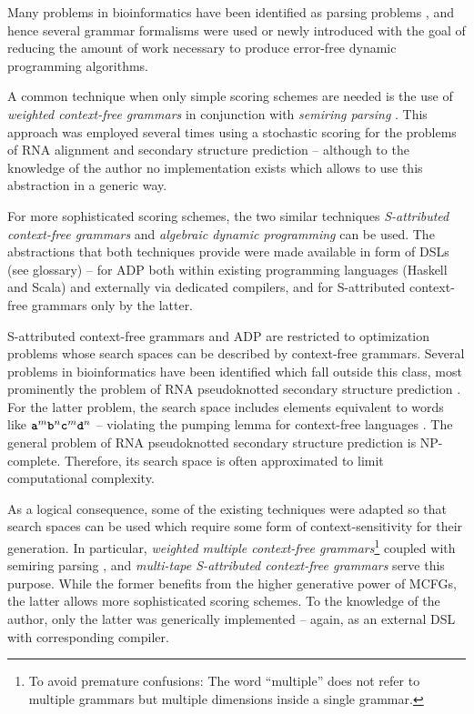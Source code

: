 \documentclass[
    a4paper,
    12pt,
    twoside,
    BCOR=12mm,
    parskip=half,
    chapterprefix,
    numbers=noenddot,
    bibliography=totoc
]{scrbook}
\begin{document}
Many problems in bioinformatics have been identified as parsing problems \citep{searls_linguistic_1997}, and hence several grammar formalisms were used or newly introduced with the goal of reducing the amount of work necessary to produce error-free dynamic programming algorithms.

A common technique when only simple scoring schemes are needed is the use of \emph{weighted context-free grammars} in conjunction with \emph{semiring parsing} \citep{goodman_semiring_1999}. This approach was employed several times using a stochastic scoring for the problems of RNA alignment and secondary structure prediction \citep{brown_small_2000,eddy_rna_1994,sakakibara_recent_1994} -- although to the knowledge of the author no implementation exists which allows to use this abstraction in a generic way.

For more sophisticated scoring schemes, the two similar techniques \emph{S-attributed context-free grammars} \citep{lefebvre_optimized_1995} and \emph{algebraic dynamic programming} \citep{giegerich_discipline_2004} can be used. The abstractions that both techniques provide were made available in form of \glspl{DSL} (see glossary) -- for \gls{ADP} both within existing programming languages (Haskell and Scala) and externally via dedicated compilers, and for S-attributed context-free grammars only by the latter.

S-attributed context-free grammars and \gls{ADP} are restricted to optimization problems whose search spaces can be described by context-free grammars. Several problems in bioinformatics have been identified which fall outside this class, most prominently the problem of RNA pseudoknotted secondary structure prediction \citep{nebel_algebraic_2012}. For the latter problem, the search space includes elements equivalent to words like $\ts{a}^m \ts{b}^n \ts{c}^m \ts{d}^n$ -- violating the pumping lemma for context-free languages \citep[p. 279]{hopcroft_introduction_2001}. The general problem of RNA pseudoknotted secondary structure prediction is NP-complete. Therefore, its search space is often approximated to limit computational complexity.
 
As a logical consequence, some of the existing techniques were adapted so that search spaces can be used which require some form of context-sensitivity for their generation. In particular, \emph{weighted multiple context-free grammars}\footnote{To avoid premature confusions: The word ``multiple'' does not refer to multiple grammars but multiple dimensions inside a single grammar.} coupled with semiring parsing \citep{kato_rna_2006,kato_grammatical_2009}, and \emph{multi-tape S-attributed context-free grammars} \citep{lefebvre_grammar-based_1996} serve this purpose. While the former benefits from the higher generative power of \glspl{MCFG}, the latter allows more sophisticated scoring schemes. To the knowledge of the author, only the latter was generically implemented -- again, as an external \gls{DSL} with corresponding compiler.
\end{document}
